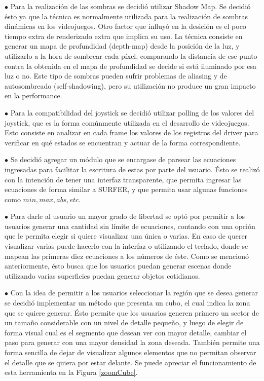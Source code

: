 \documentclass[12pt]{article}
\begin{document}
$\bullet$ Para la realización de las sombras se decidió utilizar Shadow Map\cite{shadowmap}\cite{realtimerendering}. Se decidió ésto ya que la técnica es normalmente utilizada para la realización de sombras dinámicas en los videojuegos\cite{engine}\cite{realtimerendering}. Otro factor que influyó en la desición es el poco tiempo extra de renderizado extra que implica su uso. La técnica consiste en generar un mapa de profundidad (depth-map) desde la posición de la luz, y utilizarlo a la hora de sombrear cada píxel, comparando la distancia de ese punto contra la obtenida en el mapa de profundidad se decide si está iluminado por esa luz o no. Este tipo de sombras pueden sufrir problemas de aliasing y de autosombreado (self-shadowing)\cite{realtimerendering}, pero su utilización no produce un gran impacto en la performance.

$\bullet$ Para la compatibilidad del joystick se decidió utilizar polling de los valores del joystick, que es la forma comúnmente utilizada en el desarrollo de videojuegos\cite{engine}. Esto consiste en analizar en cada frame los valores de los registros del driver para verificar en qué estados se encuentran y actuar de la forma correspondiente.

$\bullet$ Se decidió agregar un módulo que se encargase de parsear las ecuaciones ingresadas para facilitar la escritura de estas por parte del usuario. Ésto se realizó con la intención de tener una interfaz transparente, que permita ingresar las ecuaciones de forma similar a SURFER, y que permita usar algunas funciones como $min, max, abs, etc$.

$\bullet$ Para darle al usuario un mayor grado de libertad se optó por permitir a los usuarios generar una cantidad sin límite de ecuaciones, contando con una opción que le permita elegir si quiere visualizar una única o varias. En caso de querer visualizar varias puede hacerlo con la interfaz o utilizando el teclado, donde se mapean las primeras diez ecuaciones a los números de éste. Como se mencionó anteriormente, ésto busca que los usuarios puedan generar escenas donde utilizando varias superficies puedan generar objetos cotidianos.

$\bullet$ Con la idea de permitir a los usuarios seleccionar la región que se desea generar se decidió implementar un método que presenta un cubo, el cual indica la zona que se quiere generar. Ésto permite que los usuarios generen primero un sector de un tamaño considerable con un nivel de detalle pequeño, y luego de elegir de forma visual cual es el segmento que desean ver con mayor detalle, cambiar el paso para generar con una mayor densidad la zona deseada. También permite una forma sencilla de dejar de visualizar algunos elementos que no permitan observar el detalle que se quiera por estar delante. Se puede apreciar el funcionamiento de esta herramienta en la Figura \ref{zoomCube}.
\end{document}
